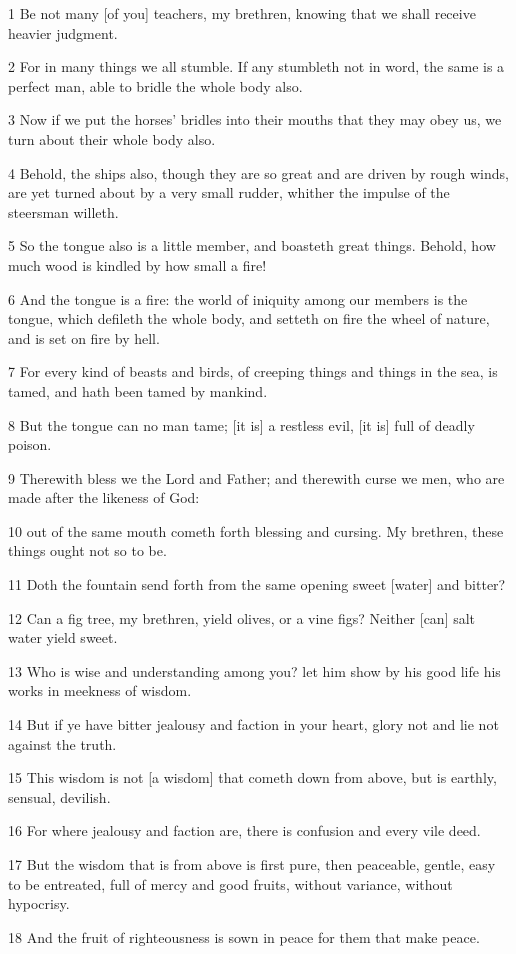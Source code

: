 \par 1 Be not many [of you] teachers, my brethren, knowing that we shall receive heavier judgment.
\par 2 For in many things we all stumble. If any stumbleth not in word, the same is a perfect man, able to bridle the whole body also.
\par 3 Now if we put the horses' bridles into their mouths that they may obey us, we turn about their whole body also.
\par 4 Behold, the ships also, though they are so great and are driven by rough winds, are yet turned about by a very small rudder, whither the impulse of the steersman willeth.
\par 5 So the tongue also is a little member, and boasteth great things. Behold, how much wood is kindled by how small a fire!
\par 6 And the tongue is a fire: the world of iniquity among our members is the tongue, which defileth the whole body, and setteth on fire the wheel of nature, and is set on fire by hell.
\par 7 For every kind of beasts and birds, of creeping things and things in the sea, is tamed, and hath been tamed by mankind.
\par 8 But the tongue can no man tame; [it is] a restless evil, [it is] full of deadly poison.
\par 9 Therewith bless we the Lord and Father; and therewith curse we men, who are made after the likeness of God:
\par 10 out of the same mouth cometh forth blessing and cursing. My brethren, these things ought not so to be.
\par 11 Doth the fountain send forth from the same opening sweet [water] and bitter?
\par 12 Can a fig tree, my brethren, yield olives, or a vine figs? Neither [can] salt water yield sweet.
\par 13 Who is wise and understanding among you? let him show by his good life his works in meekness of wisdom.
\par 14 But if ye have bitter jealousy and faction in your heart, glory not and lie not against the truth.
\par 15 This wisdom is not [a wisdom] that cometh down from above, but is earthly, sensual, devilish.
\par 16 For where jealousy and faction are, there is confusion and every vile deed.
\par 17 But the wisdom that is from above is first pure, then peaceable, gentle, easy to be entreated, full of mercy and good fruits, without variance, without hypocrisy.
\par 18 And the fruit of righteousness is sown in peace for them that make peace.

